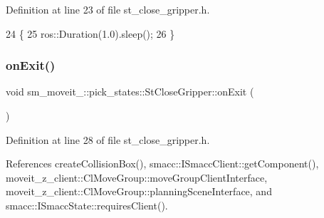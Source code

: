 Definition at line 23 of file st\+\_\+close\+\_\+gripper.\+h.


\begin{DoxyCode}
24          \{
25             ros::Duration(1.0).sleep();
26          \}
\end{DoxyCode}
\mbox{\label{structsm__moveit__4_1_1pick__states_1_1StCloseGripper_a427f4aec6a2173899b55e6a45ca28773}} 
\subsubsection{\texorpdfstring{on\+Exit()}{onExit()}}
{\footnotesize\ttfamily void sm\+\_\+moveit\+\_\+::pick\+\_\+states\+::\+St\+Close\+Gripper\+::on\+Exit (\begin{DoxyParamCaption}{ }\end{DoxyParamCaption})\hspace{0.3cm}{\ttfamily [inline]}}



Definition at line 28 of file st\+\_\+close\+\_\+gripper.\+h.



References create\+Collision\+Box(), smacc\+::\+I\+Smacc\+Client\+::get\+Component(), moveit\+\_\+z\+\_\+client\+::\+Cl\+Move\+Group\+::move\+Group\+Client\+Interface, moveit\+\_\+z\+\_\+client\+::\+Cl\+Move\+Group\+::planning\+Scene\+Interface, and smacc\+::\+I\+Smacc\+State\+::requires\+Client().


